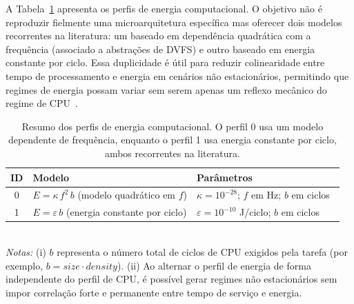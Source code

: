 A Tabela~\ref{tab:energy-profiles-summary} apresenta os perfis de energia computacional. O objetivo não é reproduzir fielmente uma microarquitetura específica mas oferecer dois modelos recorrentes na literatura: um baseado em dependência quadrática com a frequência (associado a abstrações de \gls{DVFS}) e outro baseado em energia constante por ciclo. Essa duplicidade é útil para reduzir colinearidade entre tempo de processamento e energia em cenários não estacionários, permitindo que regimes de energia possam variar sem serem apenas um reflexo mecânico do regime de \gls{CPU}~\cite{liu2022multitask_mec,yang2019noma_mec}.

\begin{table}[htbp]
\centering
\caption{Resumo dos perfis de energia computacional. O perfil 0 usa um modelo dependente de frequência, enquanto o perfil 1 usa energia constante por ciclo, ambos recorrentes na literatura.}
\label{tab:energy-profiles-summary}
\footnotesize
\setlength{\tabcolsep}{6pt}
\begin{tabular}{c|p{4.6cm}|p{4.9cm}}
\hline
\textbf{ID} & \textbf{Modelo} & \textbf{Parâmetros} \\
\hline
0 &
$E = \kappa \, f^{2} \, b$ (modelo quadrático em $f$) &
$\kappa = 10^{-28}$; $f$ em Hz; $b$ em ciclos~\cite{liu2022multitask_mec} \\
\hline
1 &
$E = \varepsilon \, b$ (energia constante por ciclo) &
$\varepsilon = 10^{-10}$ J/ciclo; $b$ em ciclos~\cite{yang2019noma_mec} \\
\hline
\end{tabular}
\vspace{2pt}
\\
{\footnotesize \textit{Notas:} (i) $b$ representa o número total de ciclos de \gls{CPU} exigidos pela tarefa (por exemplo, $b = \textit{size} \cdot \textit{density}$). (ii) Ao alternar o perfil de energia de forma independente do perfil de \gls{CPU}, é possível gerar regimes não estacionários sem impor correlação forte e permanente entre tempo de serviço e energia.}
\end{table}